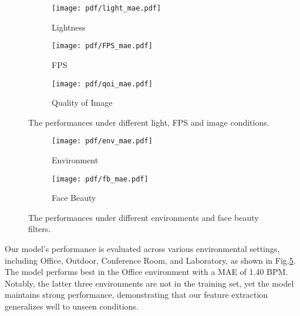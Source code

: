 \begin{figure}[t]
    \centering
    \begin{minipage}{0.8\linewidth}
        \begin{subfigure}{0.32\linewidth}
            \texttt{[image: pdf/light\_mae.pdf]}
            \caption{Lightness}
            \label{subfig:light}
        \end{subfigure}\hfill
        \begin{subfigure}{0.32\linewidth}
            \texttt{[image: pdf/FPS\_mae.pdf]}
            \caption{FPS}
            \label{subfig:FPS}
        \end{subfigure}\hfill
        \begin{subfigure}{0.32\linewidth}
            \texttt{[image: pdf/qoi\_mae.pdf]}
            \caption{Quality of Image}
            \label{subfig:qoi}
        \end{subfigure}
        \caption{The performances under different light, FPS and image conditions.}
        \label{fig: res_light-FPS-qoi}
    \end{minipage}\hfill
\end{figure}
\begin{figure}[t]
\centering
    \begin{minipage}{0.8\linewidth}
        \begin{subfigure}{0.42\linewidth}
            \texttt{[image: pdf/env\_mae.pdf]}
            \caption{Environment}
            \label{subfig:env}
        \end{subfigure}\hfill
        \begin{subfigure}{.57\linewidth}
            \texttt{[image: pdf/fb\_mae.pdf]}
            \caption{Face Beauty}
            \label{subfig:fb}
        \end{subfigure}\hfill
    \end{minipage}
    \caption{The performances under different environments and face beauty filters.}
    \label{fig: res_fb-env}
\end{figure}
Our model's performance is evaluated across various environmental settings, including Office, Outdoor, Conference Room, and Laboratory, as shown in Fig.\ref{subfig:env}. 
The model performs best in the Office environment with a MAE of 1.40 BPM. Notably, the latter three environments are not in the training set, yet the model maintains strong performance, demonstrating that our feature extraction generalizes well to unseen conditions.

